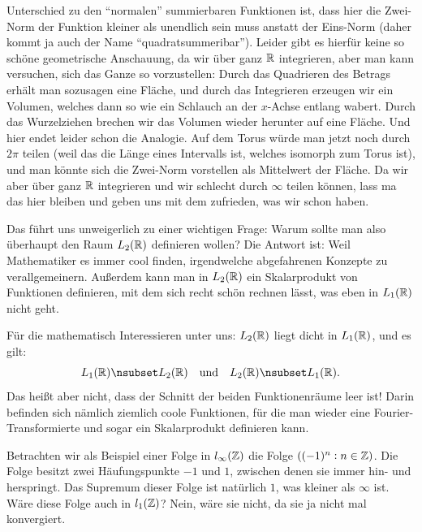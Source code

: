\begin{remark}
Unterschied zu den \enquote{normalen} summierbaren Funktionen ist, dass hier die Zwei-Norm der
Funktion kleiner als unendlich sein muss anstatt der Eins-Norm (daher kommt ja auch der Name
\enquote{quadratsummeribar}). Leider gibt es hierfür keine so schöne geometrische Anschauung, da wir
über ganz $ \mathbb{R} $ integrieren, aber man kann versuchen, sich das Ganze so vorzustellen: Durch das
Quadrieren des Betrags erhält man sozusagen eine Fläche, und durch das Integrieren erzeugen wir
ein Volumen, welches dann so wie ein Schlauch an der $ x $-Achse entlang wabert. Durch das 
Wurzelziehen brechen wir das Volumen wieder herunter auf eine Fläche. Und hier endet leider schon
die Analogie. Auf dem Torus würde man jetzt noch durch $ 2\pi $ teilen (weil das die Länge eines
Intervalls ist, welches isomorph zum Torus ist), und man könnte sich die Zwei-Norm vorstellen als
Mittelwert der Fläche. Da wir aber über ganz $ \mathbb{R} $ integrieren und wir schlecht durch $ \infty $
teilen können, lass ma das hier bleiben und geben uns mit dem zufrieden, was wir schon haben. 

Das führt uns unweigerlich zu einer wichtigen Frage: Warum sollte man also überhaupt den Raum $ 
L_{2}(\mathbb{R}) $ definieren wollen? Die Antwort ist: Weil Mathematiker es immer cool finden, 
irgendwelche abgefahrenen Konzepte zu verallgemeinern. Außerdem kann man in $ L_{2}(\mathbb{R}) $ ein 
Skalarprodukt von Funktionen definieren, mit dem sich recht schön rechnen lässt, was eben in 
$ L_{1}(\mathbb{R}) $ nicht geht.

Für die mathematisch Interessieren unter uns: $ L_{2}(\mathbb{R}) $ liegt dicht in $ L_{1}(\mathbb{R}) $, und es
gilt:
\[
  L_{1}(\R) \nsubset L_{2}(\R) \quad \text{und} \quad L_{2}(\R) \nsubset L_{1}(\R).
\]
Das heißt aber nicht, dass der Schnitt der beiden Funktionenräume leer ist! Darin befinden sich 
nämlich ziemlich coole Funktionen, für die man wieder eine Fourier-Transformierte und sogar ein
Skalarprodukt definieren kann.
\end{remark}

\begin{example}
Betrachten wir als Beispiel einer Folge in $ l_{\infty}(\mathbb{Z}) $ die Folge $ ((-1)^{n} : n \in \mathbb{Z}) $.
Die Folge besitzt zwei Häufungspunkte $ -1 $ und $ 1 $, zwischen denen sie immer hin- und 
herspringt. Das Supremum dieser Folge ist natürlich $ 1 $, was kleiner als $ \infty $ ist. Wäre 
diese Folge auch in $ l_{1}(\mathbb{Z}) $? Nein, wäre sie nicht, da sie ja nicht mal konvergiert.
\end{example}

